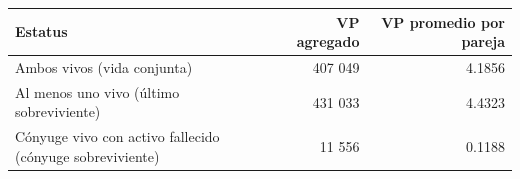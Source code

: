 \begin{tabular}{lrr}
\toprule
Estatus & VP agregado & VP promedio por pareja \\
\midrule
Ambos vivos (vida conjunta) & 407 049 & 4.1856 \\
Al menos uno vivo (último sobreviviente) & 431 033 & 4.4323 \\
Cónyuge vivo con activo fallecido (cónyuge sobreviviente) & 11 556 & 0.1188 \\
\bottomrule
\end{tabular}
